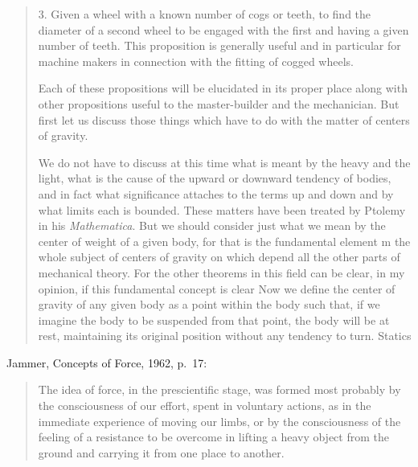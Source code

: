 \documentclass{article}
\begin{document}
\begin{quote}
3. Given a wheel with a known number of cogs or teeth, to find the
diameter of a second wheel to be engaged with the first and having a given
number of teeth. This proposition is generally useful and in particular
for machine makers in connection with the fitting of cogged wheels.

Each of these propositions will be elucidated in its proper place along
with other propositions useful to the master-builder and the mechanician.
But first let us discuss those things which have to do with the matter of
centers of gravity.

We do not have to discuss at this time what is meant by the heavy
and the light, what is the cause of the upward or downward tendency of
bodies, and in fact what significance attaches to the terms up and down
and by what limits each is bounded. These matters have been treated by
Ptolemy in his {\em Mathematica}. But we should consider just what we mean
by the center of weight of a given body, for that is the fundamental element
m the whole subject of centers of gravity on which depend all the other
parts of mechanical theory. For the other theorems in this field can be
clear, in my opinion, if this fundamental concept is clear Now we define
the center of gravity of any given body as a point within the body such that,
if we imagine the body to be suspended from that point, the body will be
at rest, maintaining its original position without any tendency to turn.
Statics
\end{quote}

Jammer, Concepts of Force, 1962, p.~17:

\begin{quote}
The idea of force, in the prescientific stage, was formed most
probably by the consciousness of our effort, spent in voluntary
actions, as in the immediate experience of moving our limbs, or
by the consciousness of the feeling of a resistance to be overcome
in lifting a heavy object from the ground and carrying it 
from one place to another. 
\end{quote}




\end{document}
